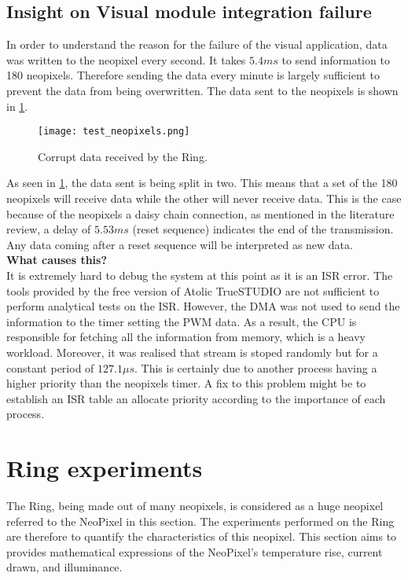 \subsection{Insight on Visual module integration failure}\label{visual_fail}
In order to understand the reason for the failure of the visual application, data was written to the neopixel every second. It takes $5.4ms$ to send information to 180 neopixels. Therefore sending the data every minute is largely sufficient to prevent the data from being overwritten. The data sent to the neopixels is shown in \cref{fig:test_neopixels}.
\begin{figure}[ht]
	\centering
	\texttt{[image: test\_neopixels.png]}
	\caption{Corrupt data received by the Ring.}
	\label{fig:test_neopixels}
\end{figure}
As seen in \cref{fig:test_neopixels}, the data sent is being split in two. This means that a set of the 180 neopixels will receive data while the other will never receive data. This is the case because of the neopixels a daisy chain connection, as mentioned in the literature review, a delay of $5.53 ms$ (reset sequence) indicates the end of the transmission. Any data coming after a reset sequence will be interpreted as new data.\\
\textbf{What causes this?}\\
It is extremely hard to debug the system at this point as it is an ISR error. The tools provided by the free version of Atolic TrueSTUDIO are not sufficient to perform analytical tests on the ISR. However, the DMA was not used to send the information to the timer setting the PWM data. As a result, the CPU is responsible for fetching all the information from memory, which is a heavy workload. Moreover, it was realised that stream is stoped randomly but for a constant period of $127.1\mu s$. This is certainly due to another process having a higher priority than the neopixels timer. A fix to this problem might be to establish an ISR table an allocate priority according to the importance of each process.    

\section{Ring experiments}
The Ring, being made out of many neopixels,  is considered as a huge neopixel referred to the NeoPixel in this section. The experiments performed on the Ring are therefore to quantify the characteristics of this neopixel. This section aims to provides mathematical expressions of the NeoPixel's temperature rise, current drawn, and illuminance.

